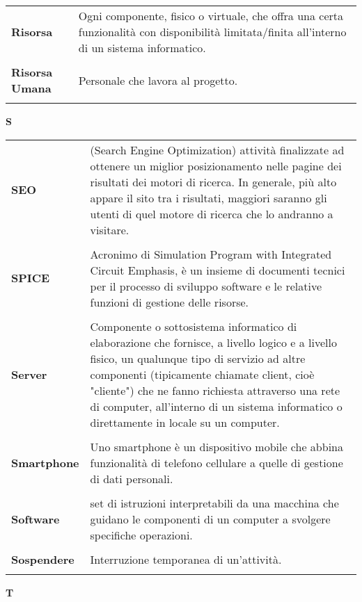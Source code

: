 {\begin{longtable}{L{4cm} p{10cm}}
 \\ 
\textbf{Risorsa} & Ogni componente, fisico o virtuale, che offra una certa funzionalità con disponibilità limitata/finita all'interno di un sistema informatico. \\ 
 \\ 
\textbf{Risorsa Umana} & Personale che lavora al progetto. \\ 
 \\ 
\end{longtable} 
\newpage 
{} 
{} 
\hfill\Huge{\textbf{S}} \\ 
\normalsize 
\begin{longtable}{L{4cm} p{10cm}}
\textbf{SEO} & (Search Engine Optimization) attività finalizzate ad ottenere un miglior posizionamento nelle pagine dei risultati dei motori di ricerca. In generale, più alto appare il sito tra i risultati, maggiori saranno gli utenti di quel motore di ricerca che lo andranno a visitare. \\ 
 \\ 
\textbf{SPICE} & Acronimo di Simulation Program with Integrated Circuit Emphasis, è un insieme di documenti tecnici per il processo di sviluppo software e le relative funzioni di gestione delle risorse. \\ 
 \\ 
\textbf{Server} & Componente o sottosistema informatico di elaborazione che fornisce, a livello logico e a livello fisico, un qualunque tipo di servizio ad altre componenti (tipicamente chiamate client, cioè "cliente") che ne fanno richiesta attraverso una rete di computer, all'interno di un sistema informatico o direttamente in locale su un computer. \\ 
 \\ 
\textbf{Smartphone} & Uno smartphone è un dispositivo mobile che abbina funzionalità di telefono cellulare a quelle di gestione di dati personali. \\ 
 \\ 
\textbf{Software} & set di istruzioni interpretabili da una macchina che guidano le componenti di un computer a svolgere specifiche operazioni. \\ 
 \\ 
\textbf{Sospendere} & Interruzione temporanea di un’attività. \\ 
 \\ 
\end{longtable} 
\newpage 
{} 
{} 
\hfill\Huge{\textbf{T}} \\ 
}
